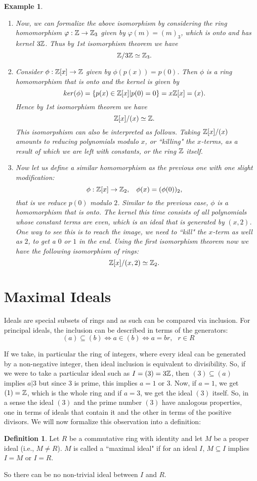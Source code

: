 \documentclass[12pt]{article}
\theoremstyle{plain}
\newtheorem{example}{Example}
\theoremstyle{definition}
\newtheorem{definition}{Definition}
\theoremstyle{remark}
\begin{document}
\begin{example}
\begin{enumerate}
    \item Now, we can formalize the above isomorphism by considering the ring homomorphism $\varphi:\mathbb{Z}\rightarrow \mathbb{Z}_3$ given by $\varphi(m) = (m)_3$, which is onto and has kernel $3\mathbb{Z}$. Thus by 1st isomorphism theorem we have
    $$\mathbb{Z}/3\mathbb{Z} \simeq \mathbb{Z}_3.$$
    \item Consider $\phi:\mathbb{Z}[x]\rightarrow \mathbb{Z}$ given by $\phi(p(x)) = p(0)$. Then $\phi$ is a ring homomorphism that is onto and the kernel is given by
    $$ker(\phi) = \{p(x) \in \mathbb{Z}[x]|p(0)=0\} = x\mathbb{Z}[x] = (x).$$
    Hence by 1st isomorphism theorem we have
    $$\mathbb{Z}[x]/(x) \simeq \mathbb{Z}.$$
    This isomorpshism can also be interpreted as follows. Taking $\mathbb{Z}[x]/(x)$ amounts to reducing polynomials modulo $x$, or ``killing" the $x$-terms, as a result of which we are left with constants, or the ring $\mathbb{Z}$ itself.
    \item Now let us define a similar homomorphism as the previous one with one slight modification:
    $$\phi:\mathbb{Z}[x]\rightarrow \mathbb{Z}_2, \:\:\:\: \phi(x) = (\phi(0))_2,$$
    that is we reduce $p(0)$ modulo $2$.
    Similar to the previous case, $\phi$ is a homomorphism that is onto. The kernel this time consists of all polynomials whose constant terms are even, which is an ideal that is generated by $(x,2)$. One way to see this is to reach the image, we need to ``kill" the $x$-term as well as $2$, to get a $0$ or $1$ in the end.
    Using the first isomorphism theorem now we have the following isomorphism of rings:
    $$\mathbb{Z}[x]/(x,2) \simeq \mathbb{Z}_2.$$

\end{enumerate}
\end{example}

\section{Maximal Ideals}
Ideals are special subsets of rings and as such can be compared via inclusion. For principal ideals, the inclusion can be described in terms of the generators:
$$(a) \subseteq (b) \Leftrightarrow a \in (b) \Leftrightarrow a=br, \:\:\:r\in R$$

If we take, in particular the ring of integers, where every ideal can be generated by a non-negative integer, then ideal inclusion is equivalent to divisibility. So, if we were to take a particular ideal such as $I = (3) = 3\mathbb{Z}$, then $(3)\subseteq (a)$ implies $a|3$ but since $3$ is prime, this implies $a=1$ or $3$. Now, if $a=1$, we get $(1)=\mathbb{Z}$, which is the whole ring and if $a=3$, we get the ideal $(3)$ itself. So, in a sense the ideal $(3)$ and the prime number $(3)$ have analogous properties, one in terms of ideals that contain it and the other in terms of the positive divisors. We will now formalize this observation into a definition:
\begin{definition}
Let $R$ be a commutative ring with identity and let $M$ be a proper ideal (i.e., $M \neq R$). $M$ is called a ``maximal ideal" if for an ideal $I$, $M\subseteq I$ implies $I=M$ or $I=R$.
\end{definition}
So there can be no non-trivial ideal between $I$ and $R$.
\end{document}
